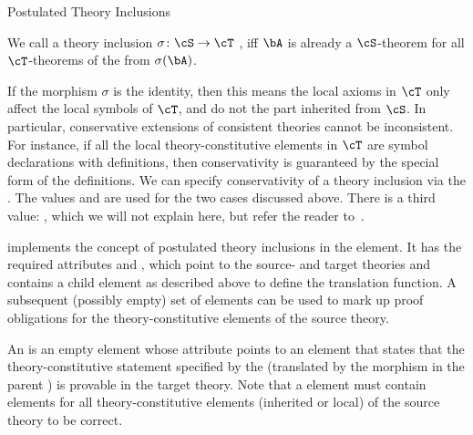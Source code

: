 \begin{omgroup}[id=complex-theories,short=Complex Theories,
                            creators=miko,contributors=frabe]
\begin{omgroup}[id=theory-inclusions]{Postulated Theory Inclusions}
\begin{module}[id=theory-morphisms]
\begin{definition}[display=flow,id=conservative.def]
  We call a theory inclusion $\sigma\colon\cS\to\cT$ , iff $\bA$ is
  already a $\cS$-theorem for all $\cT$-theorems of the from $\sigma(\bA)$.
\end{definition}
If the morphism $\sigma$ is the identity, then this means the local axioms in $\cT$ only
affect the local symbols of $\cT$, and do not the part inherited from $\cS$. In
particular, conservative extensions of consistent theories cannot be inconsistent. For
instance, if all the local theory-constitutive elements in $\cT$ are symbol declarations
with definitions, then conservativity is guaranteed by the special form of the
definitions. We can specify conservativity of a theory inclusion via the
{}. The values {}
and {} are used for the two cases discussed
above. There is a third value: {}, which we will
not explain here, but refer the reader to~\cite{MAH-06-a}.

\begin{definition}[id=theory-inclusion.def]
  \omdoc implements the concept of postulated theory inclusions in the
  {} {} element. It has the required
  attributes  and ,
  which point to the source- and target theories and contains a  child
  element as described above to define the translation function. A subsequent (possibly
  empty) set of  elements can be used to mark up proof obligations
  for the theory-constitutive elements of the source theory.
\end{definition}

\begin{definition}[id=obligation.def]
  An {} is an empty element whose 
  attribute points to an  element that states that the
  theory-constitutive statement specified by the 
  (translated by the morphism in the parent ) is provable in
  the target theory.  Note that a  element must contain
   elements for all theory-constitutive elements (inherited or
  local) of the source theory to be correct.
\end{definition}


\end{module}
\end{omgroup}
\end{omgroup}
